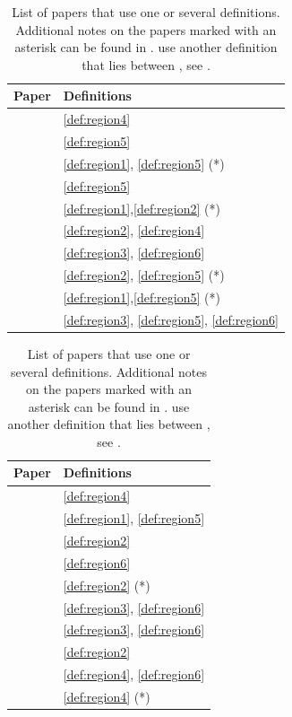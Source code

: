 \documentclass{article}
\begin{document}
\begin{table}[b]
    \centering
    \hfill
    \begin{tabular}{ll}
        \toprule
         Paper & Definitions \\
         \midrule
         \citet{pascanu2013number} & \ref{def:region4} \\
         \citet{montufar2014number} & \ref{def:region5} \\
         \citet{raghu2017expressive} & \ref{def:region1}, \ref{def:region5} (*) \\
         \citet{arora2018understanding} & \ref{def:region5} \\
         \citet{serra2018bounding} & \ref{def:region1},\ref{def:region2} (*)\\
         \citet{hanin2019deep} & \ref{def:region2}, \ref{def:region4} \\
         \citet{he2018relu} & \ref{def:region3}, \ref{def:region6} \\
         \citet{rolnick2020reverse} & \ref{def:region2}, \ref{def:region5} (*) \\
         \citet{tseran2021expected} & \ref{def:region1},\ref{def:region5} (*)\\
         \citet{chen2022improved} & \ref{def:region3}, \ref{def:region5}, \ref{def:region6} \\
        \bottomrule
    \end{tabular}\hfill\hfill
    \begin{tabular}{ll}
        \toprule
         Paper & Definitions \\
         \midrule
         
         \citet{montufar2022sharp}& \ref{def:region4} \\
         \citet{wang2022estimation}& \ref{def:region1}, \ref{def:region5}  \\
         \citet{cai2023getting}& \ref{def:region2}  \\
         \citet{hertrich2023towards}& \ref{def:region6}  \\
         \citet{huchette2023deep}& \ref{def:region2} (*)  \\
         \citet{goujon2024number} & \ref{def:region3}, \ref{def:region6} \\
         \citet{brandenburg2025decomposition} & \ref{def:region3}, \ref{def:region6} \\
         \citet{masden2022algorithmic}& \ref{def:region2} \\
         \citet{zanotti2025bounds}& \ref{def:region4}, \ref{def:region6} \\
         \citet{zanotti2025linear} & \ref{def:region4} (*)\\
        \bottomrule
    \end{tabular}
    \hfill{}\vspace{.3em}
    
    \caption{List of papers that use one or several definitions.
    Additional notes on the papers marked with an asterisk can be found in . \citet{lezeau2024tropical} use another definition that lies between , see .}
    \label{tab:literature}    
\end{table}
\end{document}
